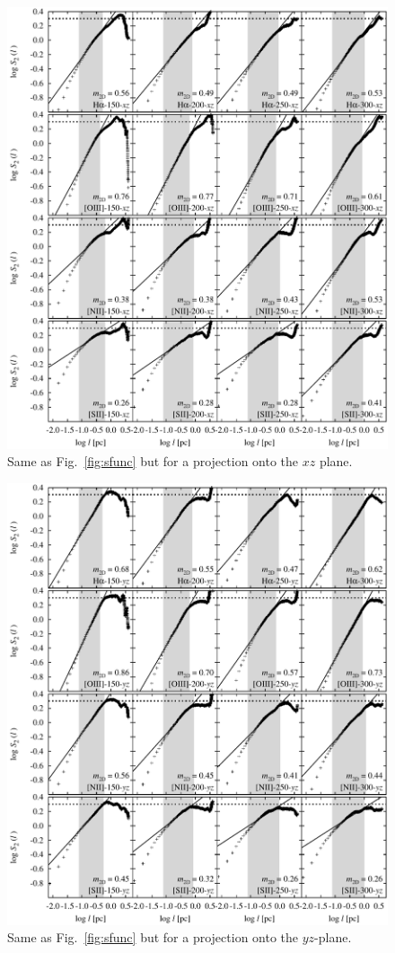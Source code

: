 \documentclass[useAMS,usenatbib]{mn2e}
\begin{document}
\begin{figure}
 \centering
 \includegraphics[width=\textwidth]{sf-all-xz-ref}
 \caption{Same as Fig.~\protect\ref{fig:sfunc} but for a projection
   onto the $xz$ plane.}
 \label{fig:sfuncxz}
\end{figure}
\begin{figure}
  \centering
  \includegraphics[width=\textwidth]{sf-all-yz-ref}
  \caption{Same as Fig.~\protect\ref{fig:sfunc} but for a projection
    onto the $yz$-plane.}
  \label{fig:sfuncyz}
\end{figure}
\end{document}
